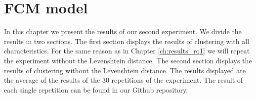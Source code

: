 \documentclass[../../main]{subfiles}
\begin{document}
\section{FCM model}
\label{ch:results_rq2}
In this chapter we present the results of our second experiment.
We divide the results in two sections. 
The first section displays the results of clustering with all characteristics.
For the same reason as in Chapter \ref{ch:results_rq1} we will repeat the experiment without the Levenshtein distance.
The second section displays the results of clustering without the Levenshtein distance.
\newline
The results displayed are the average of the results of the 30 repetitions of the experiment.
The result of each single repetition can be found in our Github repository\cite{rbasarat-repo}.
\end{document}

